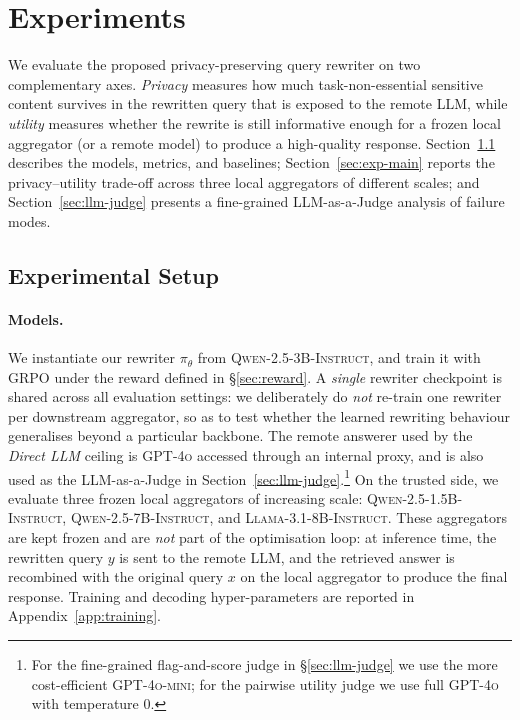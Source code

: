 
\section{Experiments}
\label{sec:experiments}

We evaluate the proposed privacy-preserving query rewriter on two
complementary axes. \emph{Privacy} measures how much
task-non-essential sensitive content survives in the rewritten query
that is exposed to the remote LLM, while \emph{utility} measures
whether the rewrite is still informative enough for a frozen local
aggregator (or a remote model) to produce a high-quality response.
Section~\ref{sec:exp-setup} describes the models, metrics, and
baselines; Section~\ref{sec:exp-main} reports the privacy--utility
trade-off across three local aggregators of different scales; and
Section~\ref{sec:llm-judge} presents a fine-grained LLM-as-a-Judge
analysis of failure modes.

\subsection{Experimental Setup}
\label{sec:exp-setup}

\paragraph{Models.}
We instantiate our rewriter $\pi_\theta$ from
\textsc{Qwen-2.5-3B-Instruct}, and train it with GRPO under the reward
defined in \S\ref{sec:reward}. A \emph{single} rewriter checkpoint is
shared across all evaluation settings: we deliberately do \emph{not}
re-train one rewriter per downstream aggregator, so as to test whether
the learned rewriting behaviour generalises beyond a particular
backbone. The remote answerer used by the \textit{Direct LLM} ceiling
is \textsc{GPT-4o} accessed through an internal proxy, and is also
used as the LLM-as-a-Judge in
Section~\ref{sec:llm-judge}.\footnote{For the fine-grained
flag-and-score judge in \S\ref{sec:llm-judge} we use the more
cost-efficient \textsc{GPT-4o-mini}; for the pairwise utility judge we
use full \textsc{GPT-4o} with temperature $0$.} On the trusted side,
we evaluate three frozen local aggregators of increasing scale:
\textsc{Qwen-2.5-1.5B-Instruct}, \textsc{Qwen-2.5-7B-Instruct}, and
\textsc{Llama-3.1-8B-Instruct}. These aggregators are kept frozen and
are \emph{not} part of the optimisation loop: at inference time, the
rewritten query $y$ is sent to the remote LLM, and the retrieved
answer is recombined with the original query $x$ on the local
aggregator to produce the final response. Training and decoding
hyper-parameters are reported in Appendix~\ref{app:training}.

